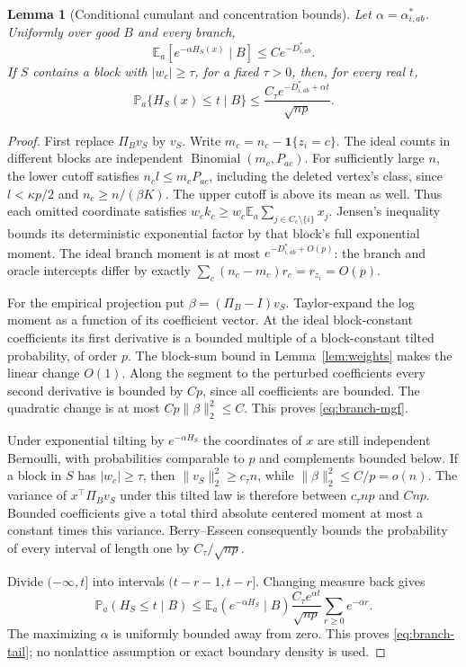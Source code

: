 \documentclass[11pt]{article}
\newtheorem{lemma}[theorem]{Lemma}
\theoremstyle{definition}
\theoremstyle{remark}
\newcommand{\E}{\mathbb E}
\newcommand{\PP}{\mathbb P}
\newcommand{\one}{\mathbf 1}
\numberwithin{equation}{section}
\begin{document}
\begin{lemma}[Conditional cumulant and concentration bounds]\label{lem:conditional}
Let $\alpha=\alpha^*_{i,ab}$. Uniformly over good $B$ and every branch,
\begin{equation}\label{eq:branch-mgf}
 \E_a[e^{-\alpha H_S(x)}\mid B]\le C e^{-D^*_{i,ab}}.
\end{equation}
If $S$ contains a block with $|w_c|\ge\tau$, for a fixed $\tau>0$, then, for every real $t$,
\begin{equation}\label{eq:branch-tail}
 \PP_a\{H_S(x)\le t\mid B\}
 \le\frac{C_\tau e^{-D^*_{i,ab}+\alpha t}}{\sqrt{np}}.
\end{equation}
\end{lemma}
\begin{proof}
First replace $\Pi_Bv_S$ by $v_S$. Write $m_c=n_c-\one\{z_i=c\}$. The ideal counts in different blocks are independent $\operatorname{Binomial}(m_c,P_{ac})$. For sufficiently large $n$, the lower cutoff satisfies $n_cl\le m_cP_{ac}$, including the deleted vertex's class, since $l<\kappa p/2$ and $n_c\ge n/(\beta K)$. The upper cutoff is above its mean as well. Thus each omitted coordinate satisfies $w_ck_c\ge w_c\E_a\sum_{j\in C_c\setminus\{i\}}x_j$. Jensen's inequality bounds its deterministic exponential factor by that block's full exponential moment. The ideal branch moment is at most $e^{-D^*_{i,ab}+O(p)}$: the branch and oracle intercepts differ by exactly $\sum_c(n_c-m_c)r_c=r_{z_i}=O(p)$.

For the empirical projection put $\beta=(\Pi_B-I)v_S$. Taylor-expand the log moment as a function of its coefficient vector. At the ideal block-constant coefficients its first derivative is a bounded multiple of a block-constant tilted probability, of order $p$. The block-sum bound in Lemma~\ref{lem:weights} makes the linear change $O(1)$. Along the segment to the perturbed coefficients every second derivative is bounded by $Cp$, since all coefficients are bounded. The quadratic change is at most $Cp\|\beta\|_2^2\le C$. This proves \eqref{eq:branch-mgf}.

Under exponential tilting by $e^{-\alpha H_S}$ the coordinates of $x$ are still independent Bernoulli, with probabilities comparable to $p$ and complements bounded below. If a block in $S$ has $|w_c|\ge\tau$, then $\|v_S\|_2^2\ge c_\tau n$, while $\|\beta\|_2^2\le C/p=o(n)$. The variance of $x^\top\Pi_Bv_S$ under this tilted law is therefore between $c_\tau np$ and $Cnp$. Bounded coefficients give a total third absolute centered moment at most a constant times this variance. Berry--Esseen consequently bounds the probability of every interval of length one by $C_\tau/\sqrt{np}$.

Divide $(-\infty,t]$ into intervals $(t-r-1,t-r]$. Changing measure back gives
\[
 \PP_a(H_S\le t\mid B)
 \le \E_a(e^{-\alpha H_S}\mid B)
       \frac{C_\tau e^{\alpha t}}{\sqrt{np}}
       \sum_{r\ge0}e^{-\alpha r}.
\]
The maximizing $\alpha$ is uniformly bounded away from zero. This proves \eqref{eq:branch-tail}; no nonlattice assumption or exact boundary density is used.
\end{proof}
\end{document}
